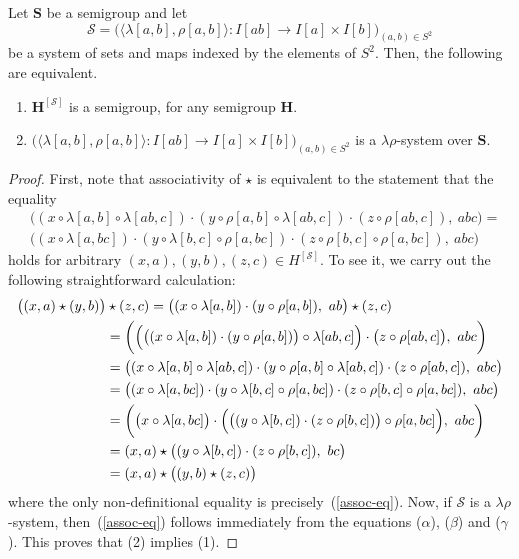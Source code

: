 \documentclass[10pt,a4paper]{amsart}
\begin{document}
\begin{theorem}\label{main}
Let $\mathbf{S}$ be a semigroup and let
$$
\mathcal{S} = 
\bigl(\langle\lambda[a,b],\rho[a,b]\rangle\colon 
I[ab]\to I[a]\times I[b]\bigr)_{(a,b)\in S^2}
$$
be a system of sets and maps indexed by the elements of $S^2$. 
Then, the following are equivalent.
\begin{enumerate}
\item $\mathbf{H}^{[\mathcal{S}]}$ is a semigroup, for any semigroup $\mathbf{H}$.
\item $\bigl(\langle\lambda[a,b],\rho[a,b]\rangle\colon 
I[ab]\to I[a]\times I[b]\bigr)_{(a,b)\in S^2}$ is a $\lambda\rho$-system over $\mathbf{S}$.
\end{enumerate}
\end{theorem}

\begin{proof} First, note that associativity of 
  $\star$ is equivalent to the statement that the equality
\begin{equation}\label{assoc-eq}
\begin{split}
&\bigl((x\circ\lambda[a,b]\circ\lambda[ab,c])
   \cdot(y\circ\rho[a,b]\circ\lambda[ab,c]) 
   \cdot(z\circ\rho[ab,c]),\ abc\bigr) = \\
&\bigl((x\circ\lambda[a,bc])
   \cdot(y\circ\lambda[b,c]\circ\rho[a,bc]) 
   \cdot(z\circ\rho[b,c]\circ\rho[a,bc]),\ abc\bigr)
\end{split}
\end{equation} 
holds for arbitrary $(x,a), (y,b), (z,c)\in H^{[\mathcal{S}]}$. 
To see it, we carry out the following straightforward calculation:
\begin{align*}
\bigl((x,a)\star(y,b)\bigr)&\star(z,c) = 
\bigl((x\circ\lambda[a,b])\cdot(y\circ\rho[a,b]),\ ab\bigr)\star (z,c) \\
&= \biggl(\Bigl(\bigl((x\circ\lambda[a,b])\cdot(y\circ\rho[a,b])\bigr)
   \circ\lambda[ab,c]\Bigr) 
   \cdot\bigl(z\circ\rho[ab,c]\bigr),\ abc\biggr) \\
&= \bigl((x\circ\lambda[a,b]\circ\lambda[ab,c])
   \cdot(y\circ\rho[a,b]\circ\lambda[ab,c]) 
   \cdot(z\circ\rho[ab,c]),\ abc\bigr) \\
&= \bigl((x\circ\lambda[a,bc])
   \cdot(y\circ\lambda[b,c]\circ\rho[a,bc]) 
   \cdot(z\circ\rho[b,c]\circ\rho[a,bc]),\ abc\bigr)\\
&= \biggl(\bigl(x\circ\lambda[a,bc]\bigr)
   \cdot\Bigl(\bigl((y\circ\lambda[b,c]) 
   \cdot(z\circ\rho[b,c])\bigr)\circ\rho[a,bc]\Bigr),\ abc\biggr) \\
&= (x,a)\star
   \bigl((y\circ\lambda[b,c])\cdot(z\circ\rho[b,c]),\ bc\bigr)\\
&= (x,a)\star\bigl((y,b)\star(z,c)\bigr)  
\end{align*}
where the only non-definitional equality is precisely~(\ref{assoc-eq}).
Now, if $\mathcal{S}$ is a  $\lambda\rho$-system, then~(\ref{assoc-eq}) 
follows immediately from the equations ($\alpha$), ($\beta$) and ($\gamma$).
This proves that (2) implies (1).


\end{proof}
\end{document}
